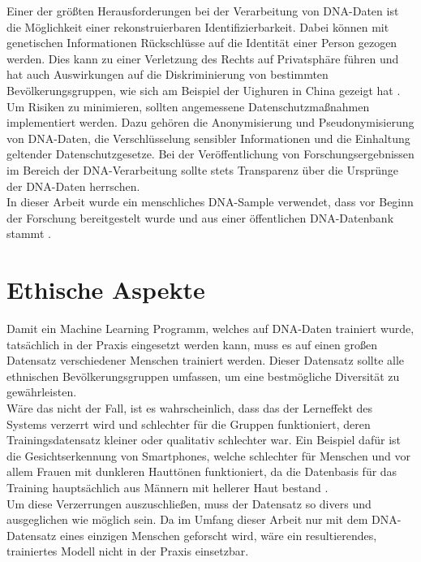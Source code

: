 \documentclass[oneside,bibliography=totocnumbered,BCOR=5mm]{scrbook}%
\theoremstyle{definition}
\theoremstyle{definition}
\theoremstyle{definition}
\theoremstyle{definition}
\theoremstyle{definition}
\theoremstyle{definition}
\begin{document}
Einer der größten Herausforderungen bei der Verarbeitung von DNA-Daten ist die Möglichkeit 
einer rekonstruierbaren Identifizierbarkeit. Dabei können mit genetischen Informationen 
Rückschlüsse auf die Identität einer Person gezogen werden. Dies kann zu einer Verletzung des Rechts 
auf Privatsphäre führen und hat auch Auswirkungen auf die Diskriminierung 
von bestimmten Bevölkerungsgruppen, wie sich am Beispiel der Uighuren in China gezeigt hat \autocite{chinaDNAprivacy}. \\

Um Risiken zu minimieren, sollten angemessene Datenschutzmaßnahmen implementiert werden. 
Dazu gehören die Anonymisierung und Pseudonymisierung von DNA-Daten, die Verschlüsselung sensibler Informationen 
und die Einhaltung geltender Datenschutzgesetze. 
Bei der Veröffentlichung von Forschungsergebnissen im Bereich der DNA-Verarbeitung sollte stets
Transparenz über die Ursprünge der DNA-Daten herrschen. \\

In dieser Arbeit wurde ein menschliches DNA-Sample verwendet, dass vor Beginn der Forschung bereitgestelt wurde und
aus einer öffentlichen DNA-Datenbank stammt \autocite{humanDNAsample}. \\



\section{Ethische Aspekte}
Damit ein Machine Learning Programm, welches auf DNA-Daten trainiert wurde, tatsächlich in der Praxis
eingesetzt werden kann, muss es auf einen großen Datensatz verschiedener Menschen trainiert werden.
Dieser Datensatz sollte alle ethnischen Bevölkerungsgruppen umfassen, um eine bestmögliche Diversität
zu gewährleisten. \\

Wäre das nicht der Fall, ist es wahrscheinlich, dass das der Lerneffekt des Systems verzerrt wird und
schlechter für die Gruppen funktioniert, deren Trainingsdatensatz kleiner oder qualitativ schlechter war.
Ein Beispiel dafür ist die Gesichtserkennung von Smartphones, welche schlechter für Menschen und 
vor allem Frauen mit dunkleren Hauttönen funktioniert, da die Datenbasis für das Training hauptsächlich
aus Männern mit hellerer Haut bestand \autocite{faceRecognition}. \\

Um diese Verzerrungen auszuschließen, muss der Datensatz so divers und ausgeglichen wie möglich sein.
Da im Umfang dieser Arbeit nur mit dem DNA-Datensatz eines einzigen Menschen geforscht wird, 
wäre ein resultierendes, trainiertes Modell nicht in der Praxis einsetzbar. \\
\end{document}
